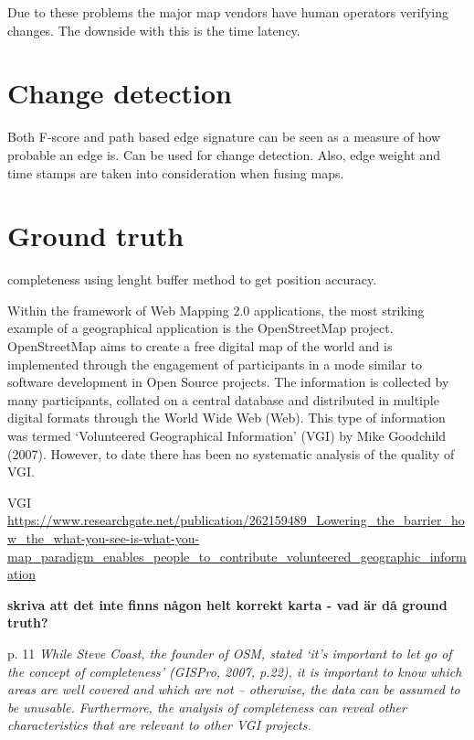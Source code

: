 Due to these problems the major map vendors have human operators verifying changes. The downside with this is the time latency.



\section{Change detection}

Both F-score and path based edge signature can be seen as a measure of how probable an edge is. Can be used for change detection. Also, edge weight and time stamps are taken into consideration when fusing maps.


\section{Ground truth}

\citep{ming}
completeness using lenght
buffer method to get position accuracy. 

\citep{haklay}
Within the framework of Web Mapping 2.0 applications, the most striking example of a geographical application is the OpenStreetMap project. OpenStreetMap aims to create a free digital map of the world and is implemented through the engagement of participants in a mode similar to software development in Open Source projects. The information is collected by many participants, collated on a central database and distributed in multiple digital formats through the World Wide Web (Web). This type of information was termed ‘Volunteered Geographical Information’ (VGI) by Mike Goodchild (2007). However, to date there has been no systematic analysis of the quality of VGI. 

VGI
\url{https://www.researchgate.net/publication/262159489_Lowering_the_barrier_how_the_what-you-see-is-what-you-map_paradigm_enables_people_to_contribute_volunteered_geographic_information}

\textbf{skriva att det inte finns någon helt korrekt karta - vad är då ground truth?}

p. 11
\textit{While Steve Coast, the founder of OSM, stated ‘it’s important to let go of the concept of completeness’ (GISPro, 2007, p.22), it is important to know which areas are well covered and which are not – otherwise, the data can be assumed to be unusable. Furthermore, the analysis of completeness can reveal other characteristics that are relevant to other VGI projects.} \citep{haklay}

